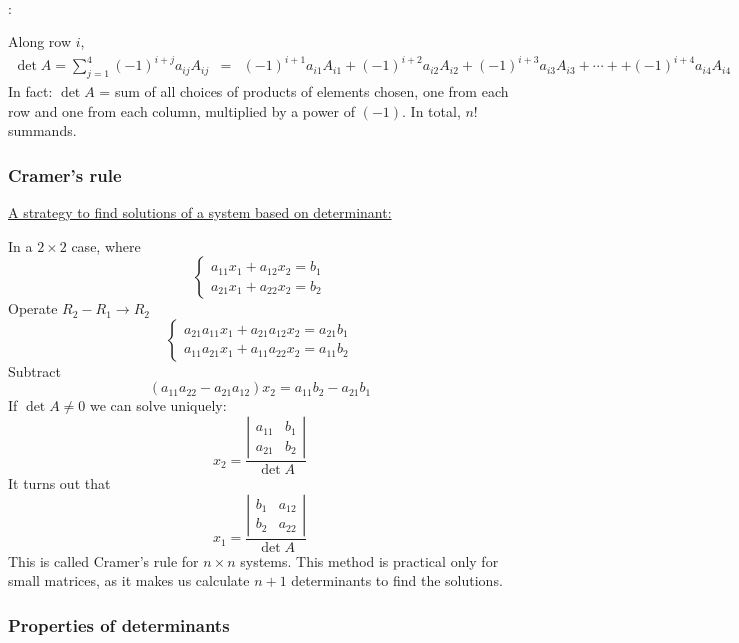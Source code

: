 \documentclass{article}
\newcommand{\nocomma}{}
\begin{document}
\

:

Along row $i$,
\begin{eqnarray*}
  \det A = \sum_{j = 1}^4 (- 1)^{i + j} a_{i \nocomma j} A_{i \nocomma j} & =
  & (- 1)^{i + 1} a_{i \nocomma 1} A_{i \nocomma 1} + (- 1)^{i + 2} a_{i
  \nocomma 2} A_{i \nocomma 2} + (- 1)^{i + 3} a_{i \nocomma 3} A_{i \nocomma
  3} + \cdots + + (- 1)^{i + 4} a_{i \nocomma 4} A_{i \nocomma 4}
\end{eqnarray*}
In fact: $\det A$ = sum of all choices of products of elements chosen, one
from each row and one from each column, multiplied by a power of $(- 1)$. In
total, $n!$ summands.

\subsubsection{Cramer's rule}

{\underline{A strategy to find solutions of a system based on determinant:}}

In a $2 \times 2$ case, where
\[ \left\{\begin{array}{l}
     a_{11} x_1 + a_{12} x_2 = b_1\\
     a_{21} x_1 + a_{22} x_2 = b_2
   \end{array}\right. \]
Operate $R_2 - R_1 \rightarrow R_2$
\[ \left\{\begin{array}{l}
     a_{21} a_{11} x_1 + a_{21} a_{12} x_2 = a_{21} b_1\\
     a_{11} a_{21} x_1 + a_{11} a_{22} x_2 = a_{11} b_2
   \end{array}\right. \]
Subtract
\[ (a_{11} a_{22} - a_{21} a_{12}) x_2 = a_{11} b_2 - a_{21} b_1 \]
If $\det A \neq 0$ we can solve uniquely:
\[ x_2 = \frac{\left|\begin{array}{cc}
     a_{11} & b_1\\
     a_{21} & b_2
   \end{array}\right|}{\det A} \]
It turns out that
\[ x_1 = \frac{\left|\begin{array}{cc}
     b_1 & a_{12}\\
     b_2 & a_{22}
   \end{array}\right|}{\det A} \]
This is called Cramer's rule for $n \times n$ systems. This method is
practical only for small matrices, as it makes us calculate $n + 1$
determinants to find the solutions.

\subsubsection{Properties of determinants}
\end{document}
